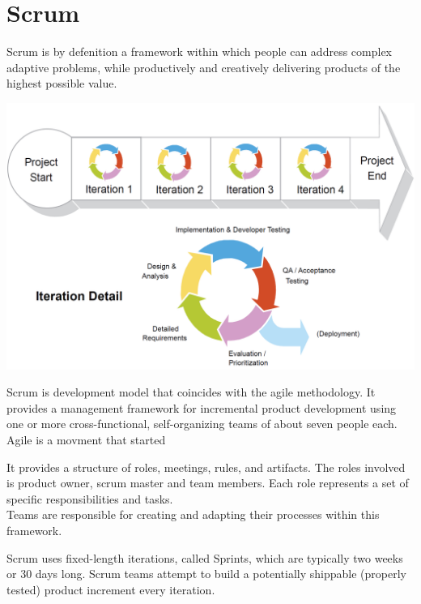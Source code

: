 


\section{Scrum}

Scrum is by defenition a framework within which people can address complex adaptive problems, while productively and creatively delivering products of the highest possible value\cite{scrumguides}. 


\includegraphics[scale=0.81]{VAPIQ-PICTURES/ScrumProcess.PNG}



Scrum is development model that coincides with the agile methodology. It provides a management framework for incremental product development using one or more cross-functional, self-organizing teams of about seven people each.\\

Agile is a movment that started 

It provides a structure of roles, meetings, rules, and artifacts. The roles involved is product owner, scrum master and team members. Each role represents a set of specific responsibilities and tasks.\\

Teams are
responsible for creating and adapting their processes within this
framework. 

Scrum uses fixed-length iterations, called Sprints, which are typically
two weeks or 30 days long. Scrum teams attempt to build a potentially
shippable (properly tested) product increment every
iteration\cite{ScrumReferenceCard}.
\\\\



